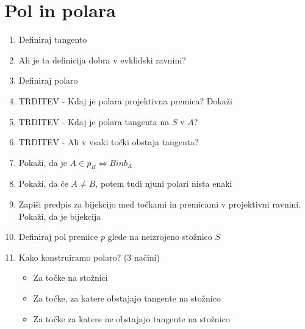\documentclass{article}
\begin{document}
    \section{Pol in polara}
    \begin{enumerate}
        \item Definiraj tangento
        \item Ali je ta definicija dobra v evklidski ravnini?
        \item Definiraj polaro
        \item TRDITEV - Kdaj je polara projektivna premica? Dokaži
        \item TRDITEV - Kdaj je polara tangenta na $S$ v $A$?
        \item TRDITEV - Ali v vsaki točki obstaja tangenta?
        \item Pokaži, da je $A \in p_B \Leftrightarrow B in b_A$
        \item Pokaži, da če $A \neq B$, potem tudi njuni polari nista enaki
        \item Zapiši predpis za bijekcijo med točkami in premicami v projektivni ravnini. Pokaži, da je bijekcija
        \item Definiraj pol premice $p$ glede na neizrojeno stožnico $S$
        \item Kako konstruiramo polaro? (3 načini)
        \begin{itemize}
            \item Za točke na stožnici
            \item Za točke, za katere obstajajo tangente na stožnico
            \item Za točke za katere ne obstajajo tangente na stožnico 
        \end{itemize}
    \end{enumerate}
\end{document}
